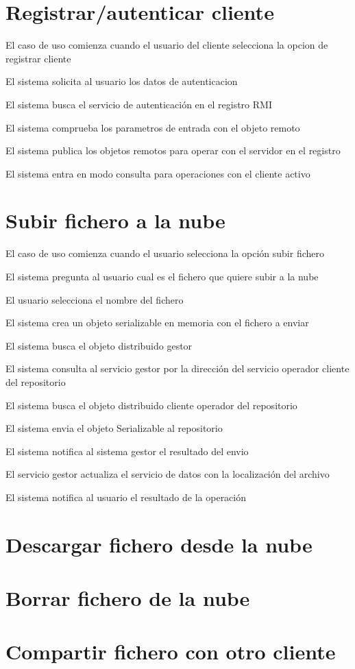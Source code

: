 \section{Registrar/autenticar cliente}

\begin{compactenum}
	\item El caso de uso comienza cuando el usuario del cliente selecciona la opcion de registrar cliente
	\item El sistema solicita al usuario los datos de autenticacion
	\item El sistema busca el servicio de autenticación en el registro RMI
	\item El sistema comprueba los parametros de entrada con el objeto remoto
	\item El sistema publica los objetos remotos para operar con el servidor en el registro
	\item El sistema entra en modo consulta para operaciones con el cliente activo
\end{compactenum}



\section{Subir fichero a la nube}
\begin{compactenum}
	\item El caso de uso comienza cuando el usuario selecciona la opción subir fichero
	\item El sistema pregunta al usuario cual es el fichero que quiere subir a la nube
	\item El usuario selecciona el nombre del fichero
	\item El sistema crea un objeto serializable en memoria con el fichero a enviar
	\item El sistema busca el objeto distribuido gestor
	\item El sistema consulta al servicio gestor por la dirección del servicio operador cliente del repositorio
	\item El sistema busca el objeto distribuido cliente operador del repositorio
	\item El sistema envia el objeto Serializable al repositorio
	\item El sistema notifica al sistema gestor el resultado del envio
	\item El servicio gestor actualiza el servicio de datos con la localización del archivo
	\item El sistema notifica al usuario el resultado de la operación
\end{compactenum}

\section{Descargar fichero desde la nube}

\section{Borrar fichero de la nube}

\section{Compartir fichero con otro cliente}
